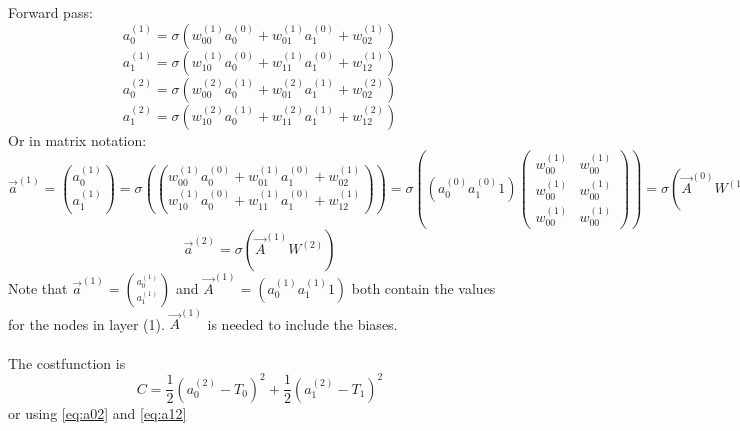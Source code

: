 \documentclass{article}
\begin{document}
Forward pass:
\begin{equation} \label{eq:a01}
a_0^{(1)} = \sigma(w_{00}^{(1)}a_0^{(0)}+w_{01}^{(1)}a_1^{(0)}+w_{02}^{(1)})
\end{equation}
\begin{equation} \label{eq:a11}
a_1^{(1)} = \sigma(w_{10}^{(1)}a_0^{(0)}+w_{11}^{(1)}a_1^{(0)}+w_{12}^{(1)})
\end{equation}
\begin{equation} \label{eq:a02}
a_0^{(2)} = \sigma(w_{00}^{(2)}a_0^{(1)}+w_{01}^{(2)}a_1^{(1)}+w_{02}^{(2)})
\end{equation}
\begin{equation} \label{eq:a12}
a_1^{(2)} = \sigma(w_{10}^{(2)}a_0^{(1)}+w_{11}^{(2)}a_1^{(1)}+w_{12}^{(2)})
\end{equation}
Or in matrix notation:
\[
\vec a^{(1)} = \binom{a_0^{(1)}}{a_1^{(1)}}
 = \sigma(\binom{w_{00}^{(1)}a_0^{(0)}+w_{01}^{(1)}a_1^{(0)}+w_{02}^{(1)}}{w_{10}^{(1)}a_0^{(0)}+w_{11}^{(1)}a_1^{(0)}+w_{12}^{(1)}}) 
= \sigma((a_0^{(0)} a_1^{(0)} 1) \begin{pmatrix}
w_{00}^{(1)} & w_{00}^{(1)} \\
w_{00}^{(1)} & w_{00}^{(1)} \\
 w_{00}^{(1)} & w_{00}^{(1)}
\end{pmatrix})
= \sigma(\vec A^{(0)}W^{(1)}) 
\]
\[
\vec a^{(2)} = \sigma(\vec A^{(1)}W^{(2)})
\]
Note that $\vec a^{(1)} = \binom{a_0^{(1)}}{a_1^{(1)}}$ and $
\vec A^{(1)} = (a_0^{(1)} a_1^{(1)} 1)$ both contain the values for the nodes in layer (1). $\vec A^{(1)}$ is needed to include the biases.
\\
\\ The costfunction is $$ C = \frac {1}{2}(a_0^{(2)}-T_0)^2 + \frac {1}{2}(a_1^{(2)}-T_1)^2 $$
or using \eqref{eq:a02} and \eqref{eq:a12}
\end{document}
